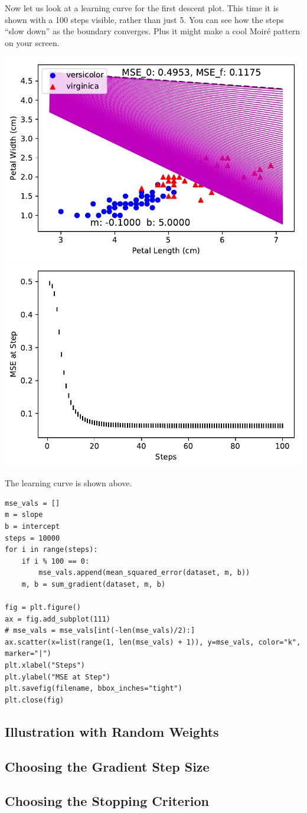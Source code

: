 \documentclass[letterpaper]{article}
\begin{document}
Now let us look at a learning curve for the first descent plot. This time it
is shown with a 100 steps visible, rather than just 5. You can see how the steps
``slow down'' as the boundary converges. Plus it might make a cool Moiré pattern
on your screen.
\begin{center}
\includegraphics{plot_3b_1.pdf}
\includegraphics{plot_3b_2.pdf}
\end{center}
The learning curve is shown above.
\begin{verbatim}
mse_vals = []
m = slope
b = intercept
steps = 10000
for i in range(steps):
    if i % 100 == 0:
        mse_vals.append(mean_squared_error(dataset, m, b))
    m, b = sum_gradient(dataset, m, b)

fig = plt.figure()
ax = fig.add_subplot(111)
# mse_vals = mse_vals[int(-len(mse_vals)/2):]
ax.scatter(x=list(range(1, len(mse_vals) + 1)), y=mse_vals, color="k", marker="|")
plt.xlabel("Steps")
plt.ylabel("MSE at Step")
plt.savefig(filename, bbox_inches="tight")
plt.close(fig)
\end{verbatim}

\subsection{Illustration with Random Weights}

\subsection{Choosing the Gradient Step Size}
\subsection{Choosing the Stopping Criterion}
\end{document}
